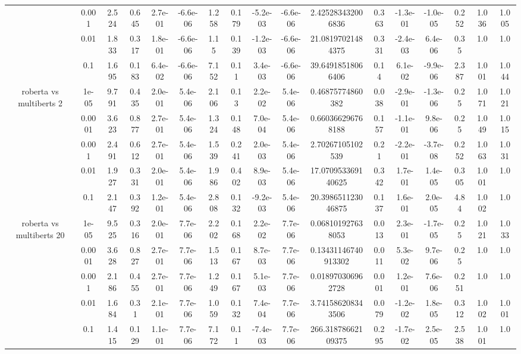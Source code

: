 \begin{tabular}{|c|c|c|c|c|c|c|c|c|c|c|c|c|c|c|c|c|}
 & 0.001 & 2.524 & 0.645 & 2.7e-01 & -6.6e-06 & 1.258 & 0.179 & -5.2e-03 & -6.6e-06 & 2.425283432006836 & 0.363 & -1.3e-01 & -1.0e-05 & 0.252 & 1.036 & 1.005 \\
 & 0.01 & 1.833 & 0.317 & 1.8e-01 & -6.6e-06 & 1.15 & 0.139 & -1.2e-03 & -6.6e-06 & 21.08197021484375 & 0.331 & -2.4e-03 & 6.4e-06 & 0.35 & 1.0 & 1.0 \\
 & 0.1 & 1.695 & 0.183 & 6.4e-02 & -6.6e-06 & 7.152 & 0.11 & 3.4e-03 & -6.6e-06 & 39.64918518066406 & 0.14 & 6.1e-02 & -9.9e-06 & 2.387 & 1.001 & 1.044 \\
\hline
\multirow{5}{*}{roberta  vs multiberts 2} & 1e-05 & 9.791 & 0.435 & 2.0e-01 & 5.4e-06 & 2.106 & 0.13 & 2.2e-02 & 5.4e-06 & 0.46875774860382 & 0.038 & -2.9e-01 & -1.3e-06 & 0.25 & 1.071 & 1.021 \\
 & 0.0001 & 3.623 & 0.877 & 2.7e-01 & 5.4e-06 & 1.324 & 0.148 & 7.0e-04 & 5.4e-06 & 0.660366296768188 & 0.157 & -1.1e-01 & 9.8e-06 & 0.25 & 1.049 & 1.015 \\
 & 0.001 & 2.491 & 0.612 & 2.7e-01 & 5.4e-06 & 1.539 & 0.241 & 2.0e-03 & 5.4e-06 & 2.70267105102539 & 0.21 & -2.2e-01 & -3.7e-08 & 0.252 & 1.063 & 1.031 \\
 & 0.01 & 1.927 & 0.331 & 2.0e-01 & 5.4e-06 & 1.986 & 0.402 & 8.9e-03 & 5.4e-06 & 17.070953369140625 & 0.342 & 1.7e-01 & 1.4e-05 & 0.305 & 1.001 & 1.0 \\
 & 0.1 & 2.147 & 0.392 & 1.2e-01 & 5.4e-06 & 2.808 & 0.132 & -9.2e-03 & 5.4e-06 & 20.398651123046875 & 0.137 & 1.6e-01 & 2.0e-05 & 4.84 & 1.002 & 1.0 \\
\hline
\multirow{5}{*}{roberta  vs multiberts 20} & 1e-05 & 9.525 & 0.316 & 2.0e-01 & 7.7e-06 & 2.202 & 0.168 & 2.2e-02 & 7.7e-06 & 0.068101927638053 & 0.013 & 2.3e-01 & -1.7e-05 & 0.25 & 1.021 & 1.033 \\
 & 0.0001 & 3.628 & 0.827 & 2.7e-01 & 7.7e-06 & 1.513 & 0.167 & 8.7e-03 & 7.7e-06 & 0.13431146740913302 & 0.011 & 5.3e-02 & 9.7e-06 & 0.25 & 1.0 & 1.0 \\
 & 0.001 & 2.186 & 0.455 & 2.7e-01 & 7.7e-06 & 1.249 & 0.167 & 5.1e-03 & 7.7e-06 & 0.018970306962728 & 0.001 & 1.2e-01 & 7.6e-06 & 0.251 & 1.0 & 1.0 \\
 & 0.01 & 1.684 & 0.31 & 2.1e-01 & 7.7e-06 & 1.059 & 0.132 & 7.4e-04 & 7.7e-06 & 3.741586208343506 & 0.079 & -1.2e-02 & 1.8e-05 & 0.312 & 1.002 & 1.001 \\
 & 0.1 & 1.415 & 0.129 & 1.1e-01 & 7.7e-06 & 7.172 & 0.11 & -7.4e-03 & 7.7e-06 & 266.31878662109375 & 0.295 & -1.7e-02 & 2.5e-05 & 2.538 & 1.001 & 1.0 \\

\end{tabular}
